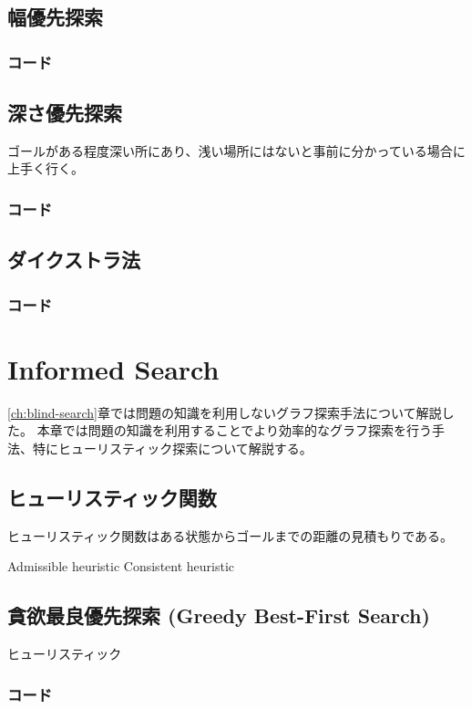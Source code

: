 \documentclass{book}
\begin{document}
\section{幅優先探索}


\subsection{コード}

\section{深さ優先探索}
ゴールがある程度深い所にあり、浅い場所にはないと事前に分かっている場合に上手く行く。

\subsection{コード}

\section{ダイクストラ法}

\subsection{コード}


\chapter{Informed Search}
\ref{ch:blind-search}章では問題の知識を利用しないグラフ探索手法について解説した。
本章では問題の知識を利用することでより効率的なグラフ探索を行う手法、特にヒューリスティック探索について解説する。

\section{ヒューリスティック関数}
ヒューリスティック関数はある状態からゴールまでの距離の見積もりである。

Admissible heuristic
Consistent heuristic

\section{貪欲最良優先探索 (Greedy Best-First Search)}
ヒューリスティック

\subsection{コード}
\end{document}
